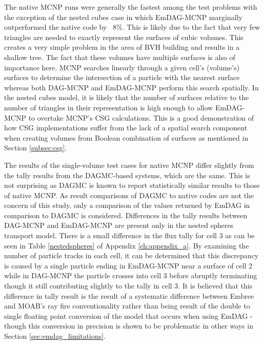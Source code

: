 The native MCNP runs were generally the fastest among the test problems with the
exception of the nested cubes case in which EmDAG-MCNP marginally outperformed
the native code by ~8\%. This is likely due to the fact that very few triangles
are needed to exactly represent the surfaces of cubic volumes. This creates a
very simple problem in the area of BVH building and results in a shallow
tree. The fact that these volumes have multiple surfaces is also of importance
here. MCNP searches linearly through a given cell's (volume's) surfaces to
determine the intersection of a particle with the nearest surface whereas both
DAG-MCNP and EmDAG-MCNP perform this search spatially. In the nested cubes
model, it is likely that the number of surfaces relative to the number of
triangles in their representation is high enough to allow EmDAG-MCNP to overtake
MCNP's CSG calculations. This is a good demonstration of how CSG implementations
suffer from the lack of a spatial search component when creating volumes from
Boolean combination of surfaces as mentioned in Section \ref{subsec:csg}.


The results of the single-volume test cases for native MCNP differ slightly from
the tally results from the DAGMC-based systems, which are the same. This is not
surprising as DAGMC is known to report statistically similar results to those of
native MCNP. As result comparisons of DAGMC to native codes are not the concern
of this study, only a comparison of the values returned by EmDAG in comparison
to DAGMC is considered. Differences in the tally results between DAG-MCNP and
EmDAG-MCNP are present only in the nested spheres transport model. There is a
small difference in the flux tally for cell 3 as can be seen in Table
\ref{nestedspheres} of Appendix \ref{ch:appendix_a}. By examining the number of
particle tracks in each cell, it can be determined that this discrepancy is
caused by a single particle ending in EmDAG-MCNP near a surface of cell 2 while
in DAG-MCNP the particle crosses into cell 3 before abruptly terminating though
it still contributing slightly to the tally in cell 3. It is believed that this
difference in tally result is the result of a systematic difference between
Embree and MOAB's ray fire conventionality rather than being result of the
double to single floating point conversion of the model that occurs when using
EmDAG - though this conversion in precision is shown to be problematic in other
ways in Section \ref{sec:emdag_limitations}.

